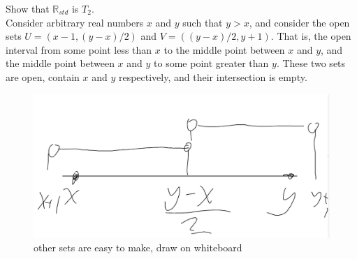 \documentclass{article}
\newcommand{\R}{\mathbb{R}}
\begin{document}
 Show that $\R_{std}$ is $T_2$.\\


 Consider arbitrary real numbers $ x$ and $y$ such that $y > x$, and consider the open sets $U = (x-1, (y - x)/2)$ and $V = ((y - x)/2, y + 1).$ That is, the open interval from  some point less than $x$ to the middle point between $x$ and $y$, and the middle point between $x$ and $y$ to some point greater than $y$. These two sets are open, contain $x$ and $y$ respectively, and their intersection is empty.

\begin{figure}[htbp]
\centerline{\includegraphics[scale=0.5]{notebook/Screenshot 2022-02-01 214410.png}}
\caption{other sets are easy to make, draw on whiteboard}
\label{fig}
\end{figure}
\end{document}
